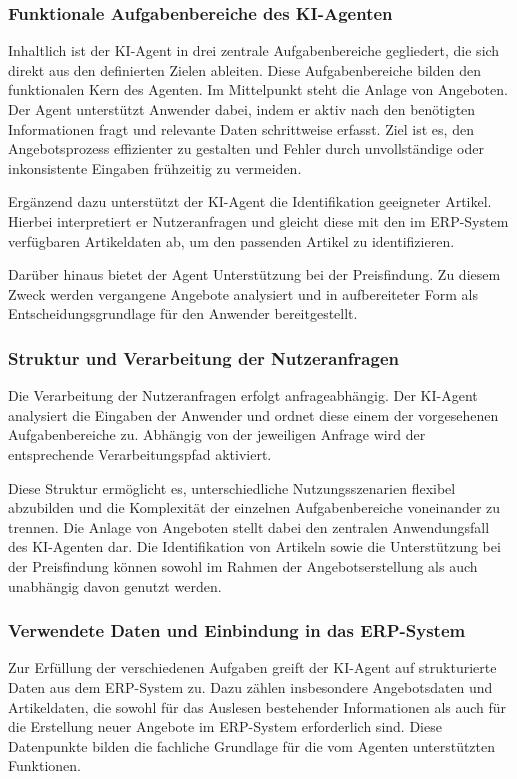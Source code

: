\subsubsection{Funktionale Aufgabenbereiche des KI-Agenten}
Inhaltlich ist der \ac{KI}-Agent in drei zentrale Aufgabenbereiche gegliedert, die sich direkt aus den definierten Zielen ableiten. Diese Aufgabenbereiche bilden den funktionalen Kern des Agenten. Im Mittelpunkt steht die Anlage von Angeboten. Der Agent unterstützt Anwender dabei, indem er aktiv nach den benötigten Informationen fragt und relevante Daten schrittweise erfasst. Ziel ist es, den Angebotsprozess effizienter zu gestalten und Fehler durch unvollständige oder inkonsistente Eingaben frühzeitig zu vermeiden.

Ergänzend dazu unterstützt der \ac{KI}-Agent die Identifikation geeigneter Artikel. Hierbei interpretiert er Nutzeranfragen und gleicht diese mit den im \ac{ERP}-System verfügbaren Artikeldaten ab, um den passenden Artikel zu identifizieren.

Darüber hinaus bietet der Agent Unterstützung bei der Preisfindung. Zu diesem Zweck werden vergangene Angebote analysiert und in aufbereiteter Form als Entscheidungsgrundlage für den Anwender bereitgestellt.

\subsubsection{Struktur und Verarbeitung der Nutzeranfragen}
Die Verarbeitung der Nutzeranfragen erfolgt anfrageabhängig. Der \ac{KI}-Agent analysiert die Eingaben der Anwender und ordnet diese einem der vorgesehenen Aufgabenbereiche zu. Abhängig von der jeweiligen Anfrage wird der entsprechende Verarbeitungspfad aktiviert.

Diese Struktur ermöglicht es, unterschiedliche Nutzungsszenarien flexibel abzubilden und die Komplexität der einzelnen Aufgabenbereiche voneinander zu trennen. Die Anlage von Angeboten stellt dabei den zentralen Anwendungsfall des \ac{KI}-Agenten dar. Die Identifikation von Artikeln sowie die Unterstützung bei der Preisfindung können sowohl im Rahmen der Angebotserstellung als auch unabhängig davon genutzt werden.

\subsubsection{Verwendete Daten und Einbindung in das ERP-System}
Zur Erfüllung der verschiedenen Aufgaben greift der \ac{KI}-Agent auf strukturierte Daten aus dem \ac{ERP}-System zu. Dazu zählen insbesondere Angebotsdaten und Artikeldaten, die sowohl für das Auslesen bestehender Informationen als auch für die Erstellung neuer Angebote im \ac{ERP}-System erforderlich sind. Diese Datenpunkte bilden die fachliche Grundlage für die vom Agenten unterstützten Funktionen.

